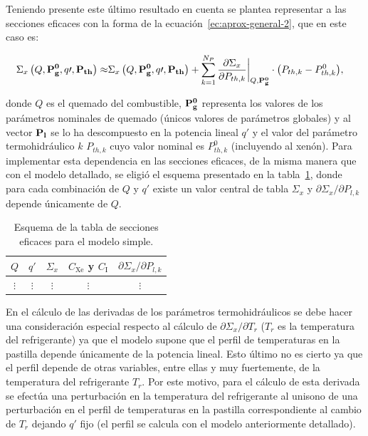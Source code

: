 \documentclass[11pt]{article}
\renewcommand{\vec}[1]{\ensuremath\mathbf{#1}}
\begin{document}
\begin{figure}[ht!]
   \label{fig:xs-vs-q}               
\end{figure}

\newpage
Teniendo presente este último resultado en cuenta se plantea representar a las secciones eficaces con la forma de la ecuación~\ref{ec:aprox-general-2}, que en este caso es:

\begin{align}
\label{ec:xs-mod-simple}
\begin{split}
 \Sigma_x \left( Q, \vec{P_g^{0}}, q\prime ,\vec{P_{th}} \right) \approx &
 \Sigma_x \left( Q, \vec{P_g^{0}}, q\prime ,\vec{P_{th}} \right) +  \sum_{k = 1}^{N_{P}}{\frac{\partial\Sigma_x}{\partial P_{{th},k}}\bigg|_{Q,\vec{P_g^{0}}} \cdot \left(P_{{th},k} - P^{0}_{{th},k} \right)},
\end{split}
\end{align}

\noindent
donde $Q$ es el quemado del combustible, $\vec{P_g^{0}}$ representa los valores de los parámetros nominales de quemado (únicos valores de parámetros globales) y al vector $\vec{P_l}$ se lo ha descompuesto en la potencia lineal $q\prime$ y el valor del parámetro termohidráulico $k$ $P_{{th},k}$ cuyo valor nominal es $P^{0}_{{th},k}$ (incluyendo al xenón). Para implementar esta dependencia en las secciones eficaces, de la misma manera que con el modelo detallado, se eligió el esquema presentado en la tabla~\ref{table:modelo-simple}, donde para cada combinación de $Q$ y $q\prime$ existe un valor central de tabla $\Sigma_x$ y $\partial\Sigma_x / \partial P_{l,k}$ depende únicamente de $Q$.

\begin{table}[hhh!]
\begin{center}
\begin{tabular}{|c|c|c|c|c|}
\hline
$Q$ & $q\prime$ & $\Sigma_x$ &  $C_{\text{Xe}}$ y $C_{\text{I}}$ & $\partial\Sigma_x / \partial P_{l,k}$ \\
\hline
$\vdots$ & $\vdots$ & $\vdots$ & $\vdots$ & $\vdots$ \\
\hline
\end{tabular}
\caption{\label{table:modelo-simple} Esquema de la tabla de secciones eficaces para el modelo simple.}
\end{center}
\end{table}

En el cálculo de las derivadas de los parámetros termohidráulicos se debe hacer una consideración especial respecto al cálculo de $\partial\Sigma_x / \partial T_r$ ($T_r$ es la temperatura del refrigerante) ya que el modelo supone que el perfil de temperaturas en la pastilla depende únicamente de la potencia lineal. Esto último no es cierto ya que el perfil depende de otras variables, entre ellas y muy fuertemente, de la temperatura del refrigerante $T_r$. Por este motivo, para el cálculo de esta derivada se efectúa una perturbación en la temperatura del refrigerante al unisono de una perturbación en el perfil de temperaturas en la pastilla correspondiente al cambio de $T_r$ dejando $q\prime$ fijo (el perfil se calcula con el modelo anteriormente detallado).
\end{document}
